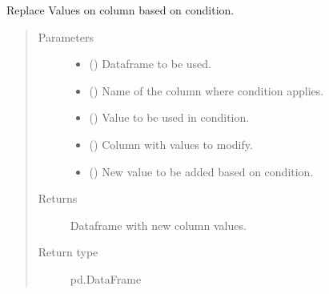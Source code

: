 \documentclass[letterpaper,10pt,english]{sphinxmanual}
\begin{document}
\begin{fulllineitems}
\label{\detokenize{source/optimization.datatools:optimization.datatools.dataprep.replace_values}}
Replace Values on column based on condition.
\begin{quote}\begin{description}
\item[{Parameters}] \leavevmode\begin{itemize}
\item {} 
 () \textendash{} Dataframe to be used.

\item {} 
 () \textendash{} Name of the column where condition applies.

\item {} 
 () \textendash{} Value to be used in condition.

\item {} 
 () \textendash{} Column with values to modify.

\item {} 
 () \textendash{} New value to be added based on condition.

\end{itemize}

\item[{Returns}] \leavevmode
{} \textendash{} Dataframe with new column values.

\item[{Return type}] \leavevmode
pd.DataFrame

\end{description}\end{quote}

\end{fulllineitems}
\end{document}

